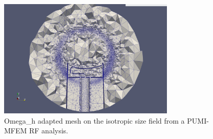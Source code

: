 \documentclass[12pt]{article}
\begin{document}
\begin{figure}[!h]
    \centering
    \includegraphics[width=0.75\textwidth]{figures/omegah_adapted_graded.png}
    \caption{Omega\_h adapted mesh on the isotropic size field from a PUMI-MFEM RF analysis.}
    \label{fig:rfAdapt}
\end{figure}

\printbibliography
\end{document}
